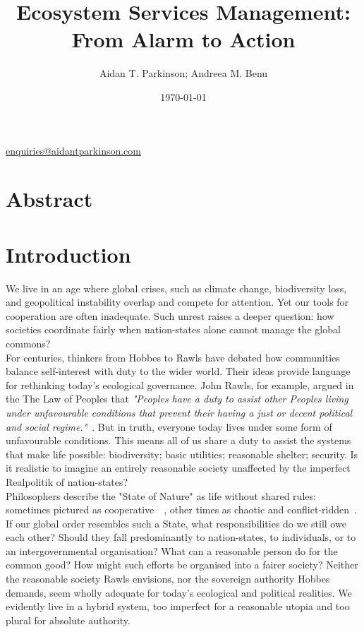 \documentclass[11pt, oneside]{article}   	%
\title{Ecosystem Services Management: From Alarm to Action}
\author{Aidan T. Parkinson; Andreea M. Benu}
\date{\today}							%
\begin{document}
\maketitle
\begin{center}
\href{mailto:enquiries@aidantparkinson.com}{enquiries@aidantparkinson.com}
\end{center}

\section{Abstract}


\section{Introduction}

We live in an age where global crises, such as climate change, biodiversity loss, and geopolitical instability overlap and compete for attention.
Yet our tools for cooperation are often inadequate.
Such unrest raises a deeper question: how societies coordinate fairly when nation-states alone cannot manage the global commons?\\

For centuries, thinkers from Hobbes to Rawls have debated how communities balance self-interest with duty to the wider world.
Their ideas provide language for rethinking today's ecological governance.
John Rawls, for example, argued in the The Law of Peoples that \emph{"Peoples have a duty to assist other Peoples living under unfavourable conditions that prevent their having a just or decent political and social regime."}~\cite{jr2}.
But in truth, everyone today lives under some form of unfavourable conditions.
This means all of us share a duty to assist the systems that make life possible: biodiversity; basic utilities; reasonable shelter; security.
Is it realistic to imagine an entirely reasonable society unaffected by the imperfect Realpolitik of nation-states?\\

Philosophers describe the "State of Nature" as life without shared rules: sometimes pictured as cooperative~\cite{jl1}~\cite{rn1}, other times as chaotic and conflict-ridden~\cite{th1}.
If our global order resembles such a State, what responsibilities do we still owe each other?
Should they fall predominantly to nation-states, to individuals, or to an intergovernmental organisation?
What can a reasonable person do for the common good?
How might such efforts be organised into a fairer society?
Neither the reasonable society Rawls envisions, nor the sovereign authority Hobbes demands, seem wholly adequate for today's ecological and political realities.
We evidently live in a hybrid system, too imperfect for a reasonable utopia and too plural for absolute authority.\\
\end{document}
